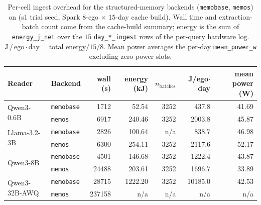 \begin{table}[t]
\centering
\caption{Per-cell ingest overhead for the structured-memory backends (\texttt{memobase}, \texttt{memos}) on \benchL (s1 trial seed, Spark $8$-ego $\times$ $15$-day cache build). Wall time and extraction-batch count come from the cache-build summary; energy is the sum of \texttt{energy\_j\_net} over the $15$ \texttt{day\_*\_ingest} rows of the per-query hardware log. $\mathrm{J\,/\,ego\cdot{}day}=\text{total energy}/15/8$. Mean power averages the per-day \texttt{mean\_power\_w} excluding zero-power slots.}
\label{tab:appendix-ingest-overhead}
\footnotesize
\setlength{\tabcolsep}{5pt}
\begin{tabular}{@{}llrrrrr@{}}
\toprule
Reader & Backend & wall (s) & energy (kJ) & $n_\text{batches}$ & J/ego$\cdot$day & mean power (W) \\
\midrule
\multirow{2}{*}{Qwen3-0.6B} & \texttt{memobase} & 1712 & 52.54 & 3252 & 437.8 & 41.69 \\
 & \texttt{memos} & 6917 & 240.46 & 3252 & 2003.8 & 45.87 \\
\midrule
\multirow{2}{*}{Llama-3.2-3B} & \texttt{memobase} & 2826 & 100.64 & n/a & 838.7 & 46.98 \\
 & \texttt{memos} & 6300 & 254.11 & 3252 & 2117.6 & 52.17 \\
\midrule
\multirow{2}{*}{Qwen3-8B} & \texttt{memobase} & 4501 & 146.68 & 3252 & 1222.4 & 43.87 \\
 & \texttt{memos} & 24488 & 203.61 & 3252 & 1696.7 & 33.89 \\
\midrule
\multirow{2}{*}{Qwen3-32B-AWQ} & \texttt{memobase} & 28715 & 1222.20 & 3252 & 10185.0 & 42.53 \\
 & \texttt{memos} & 237158 & n/a & n/a & n/a & n/a \\
\bottomrule
\end{tabular}
\end{table}

